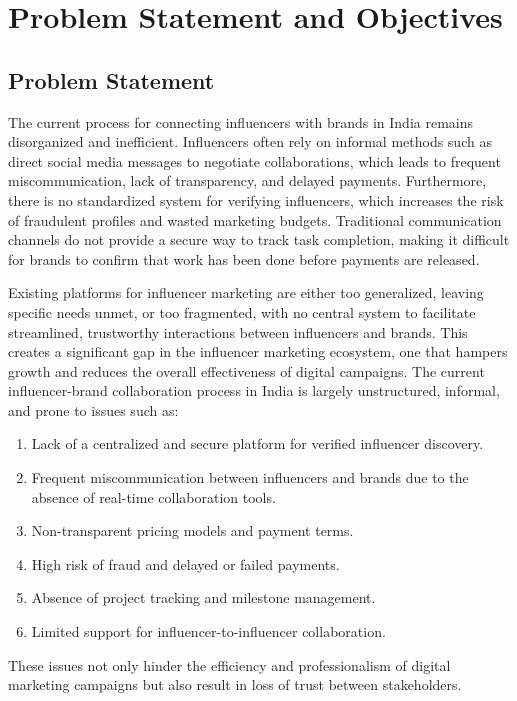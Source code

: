 \chapter{Problem Statement and Objectives}
\begin{justify}
    
\section{Problem Statement}
The current process for connecting influencers with brands in India remains disorganized and inefficient. Influencers often rely on informal methods such as direct social media messages to negotiate collaborations, which leads to frequent miscommunication, lack of transparency, and delayed payments. Furthermore, there is no standardized system for verifying influencers, which increases the risk of fraudulent profiles and wasted marketing budgets. Traditional communication channels do not provide a secure way to track task completion, making it difficult for brands to confirm that work has been done before payments are released.

Existing platforms for influencer marketing are either too generalized, leaving specific needs unmet, or too fragmented, with no central system to facilitate streamlined, trustworthy interactions between influencers and brands. This creates a significant gap in the influencer marketing ecosystem, one that hampers growth and reduces the overall effectiveness of digital campaigns. 
The current influencer-brand collaboration process in India is largely unstructured, informal, and prone to issues such as:
\begin{enumerate}
    \item Lack of a centralized and secure platform for verified influencer discovery.
    \item Frequent miscommunication between influencers and brands due to the absence of real-time collaboration tools.
    \item Non-transparent pricing models and payment terms.
    \item High risk of fraud and delayed or failed payments.
    \item Absence of project tracking and milestone management.
    \item Limited support for influencer-to-influencer collaboration.
\end{enumerate}
These issues not only hinder the efficiency and professionalism of digital marketing campaigns but also result in loss of trust between stakeholders.



\end{justify}
